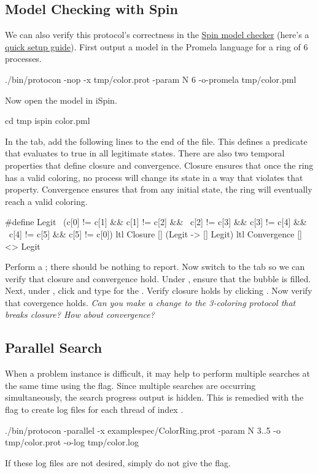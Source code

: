 \subsection{Model Checking with Spin}
We can also verify this protocol's correctness in the \href{http://spinroot.com}{Spin model checker} (here's a \href{../../tut/spin.html}{quick setup guide}).
First output a model in the Promela language for a ring of $6$ processes.
\begin{code}
./bin/protocon -nop -x tmp/color.prot -param N 6 -o-promela tmp/color.pml
\end{code}
Now open the model in iSpin.
\begin{code}
cd tmp
ispin color.pml
\end{code}
In the  tab, add the following lines to the end of the file.
This defines a predicate  that evaluates to true in all legitimate states.
There are also two temporal properties that define closure and convergence.
Closure ensures that once the ring has a valid coloring, no process will change its state in a way that violates that property.
Convergence ensures that from any initial state, the ring will eventually reach a valid coloring.
\begin{code}
#define Legit \
  (c[0] != c[1] && c[1] != c[2] && \
   c[2] != c[3] && c[3] != c[4] && \
   c[4] != c[5] && c[5] != c[0])
ltl Closure { [] (Legit -> [] Legit) }
ltl Convergence { [] <> Legit }
\end{code}
Perform a \ilkey{Syntax Check}; there should be nothing to report.
Now switch to the  tab so we can verify that closure and convergence hold.
Under , ensure that the  bubble is filled.
Next, under \ilkey{Never Claims}, click \ilkey{use claim} and type  for the .
Verify closure holds by clicking \ilkey{Run}.
Now verify that covergence holds.
\textit{Can you make a change to the 3-coloring protocol that breaks closure? How about convergence?}

\subsection{Parallel Search}
When a problem instance is difficult, it may help to perform multiple searches at the same time using the  flag.
Since multiple searches are occurring simultaneously, the search progress output is hidden.
This is remedied with the  flag to create log files  for each thread of index .
\begin{code}
./bin/protocon -parallel -x examplespec/ColorRing.prot -param N 3..5 -o tmp/color.prot -o-log tmp/color.log
\end{code}
If these log files are not desired, simply do not give the flag.

